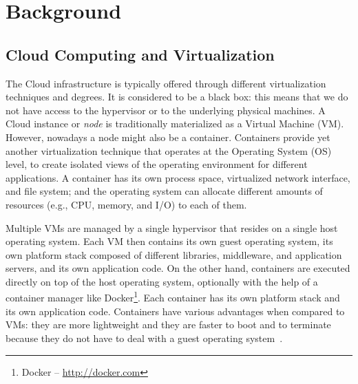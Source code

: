 \section{Background}\label{sec:background}

\subsection{Cloud Computing and Virtualization}

The Cloud infrastructure is typically offered through different virtualization techniques and degrees. It is considered to be a black box: this means that we do not have access to the hypervisor or to
the underlying physical machines. A Cloud instance or \textit{node} is traditionally materialized as a Virtual Machine (VM). However,
nowadays a node might also be a container. Containers provide yet another virtualization technique that operates at the Operating System (OS) level, to create isolated views of the operating environment for different applications. A container has its own process space, virtualized network interface, and file system; and the operating system can allocate different amounts of resources (e.g., CPU, memory, and I/O) to each of them.

Multiple VMs are managed by a single hypervisor that resides on a single host operating system. Each VM then contains its own guest operating system, its own platform stack composed of different libraries, middleware, and application servers, and its own application code. On the other hand, containers are executed directly on top of the host operating system, optionally with the help
of a container manager like Docker\footnote{Docker -- \url{http://docker.com}}. Each container has its own platform stack and its own application code. Containers have various advantages when compared to VMs: they are more lightweight and they are faster to boot and
to terminate because they do not have to deal with a guest
operating system~\cite{FelterContainerVm15,SoletzContainerVirt14}.


